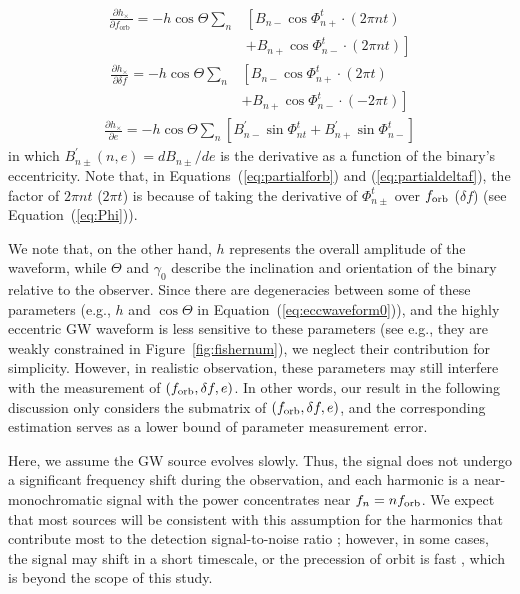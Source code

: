 \documentclass[%
 reprint,
 amsmath,amssymb,
 aps,
]{revtex4-2}
\begin{document}
\begin{align}\label{eq:partialforb}
\frac{\partial h_{\times}}{\partial f_{\text {orb }}}=-h \cos \Theta \sum_n & \left[B_{n-}\cos \Phi_{n+}^t \cdot(2 \pi n t)\right. \\\nonumber
& \left.+B_{n+} \cos \Phi_{{n-}}^t \cdot(2 \pi n t)\right]
\end{align}
\begin{align}\label{eq:partialdeltaf}
 \frac{\partial h_\times}{\partial \delta f}=-h \cos \Theta \sum_n & \left[B_{n-} \cos \Phi_{n+}^t \cdot(2 \pi t)\right. \\\nonumber
& \left.+B_{n+} \cos \Phi_{{n-}}^t \cdot(-2 \pi t)\right] 
\end{align}
\begin{align}
\frac{\partial h_{\times}}{\partial e}=-h \cos \Theta \sum_n\left[B_{n-}^{\prime} \sin \Phi_{n t}^t+B_{n+}^{\prime} \sin \Phi_{{n-}}^t\right]
\end{align}
in which $B_{n\pm}^{\prime}(n,e)=dB_{n\pm}/de$ is the derivative as a function of the binary's eccentricity. Note that, in Equations~(\ref{eq:partialforb}) and (\ref{eq:partialdeltaf}), the factor of $2\pi n t$ ($ 2\pi t$) is because of taking the derivative of $\Phi_{n\pm}^t$ over $f_{\rm orb}$ ($\delta f$) (see Equation~(\ref{eq:Phi})).

We note that, on the other hand, $h$ represents the overall amplitude of the waveform, while $\Theta$ and $\gamma_0$ describe the inclination and orientation of the binary relative to the observer. Since there are degeneracies between some of these parameters (e.g., $h$ and $\cos \Theta$ in Equation~(\ref{eq:eccwaveform0})), and the highly eccentric GW waveform is less sensitive to these parameters (see e.g., they are weakly constrained in Figure~\ref{fig:fishernum}), we neglect their contribution for simplicity. However, in realistic observation, these parameters may still interfere with the measurement of $(f_{\rm orb}, \delta f, e)$. In other words, our result in the following discussion only considers the submatrix of $(f_{\rm orb}, \delta f, e)$, and the corresponding estimation serves as a lower bound of parameter measurement error.

Here, we assume the GW source evolves slowly. Thus, the signal does not undergo a significant frequency shift during the observation, and each harmonic is a near-monochromatic signal with the power concentrates near $f_n=nf_{\rm orb}$. We expect that most sources will be consistent with this assumption for the harmonics that contribute most to the detection signal-to-noise ratio \citep[e.g.,][]{O'Leary+09,Wang+21,Xuan+23b}; however, in some cases, the signal may shift in a short timescale, or the precession of orbit is fast \citep{Hoang+19,Deme+20}, which is beyond the scope of this study.  
\end{document}
